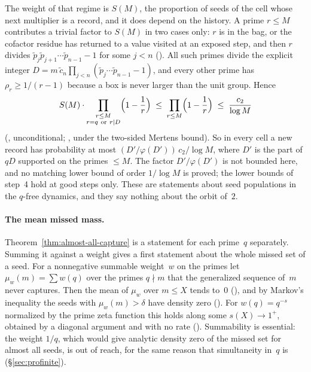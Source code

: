 The weight of that regime is $S(M)$, the proportion of seeds of the cell
whose next multiplier is a record, and it does depend on the history.  A
prime $r\le M$ contributes a trivial factor to $S(M)$ in two cases only:
$r$ is in the bag, or the cofactor residue has returned to a value visited
at an exposed step, and then $r$ divides
$\tilde p_j\tilde p_{j+1}\cdots\tilde p_{n-1}-1$ for some $j<n$
().
All such primes divide the explicit integer
$D=m\,\tilde c_n\prod_{j<n}(\tilde p_j\cdots\tilde p_{n-1}-1)$, and every
other prime has $\rho_r\ge 1/(r-1)$ because a box is never larger than the
unit group.  Hence
\[
  S(M)\cdot\prod_{\substack{r\le M\\ r=q\ \text{or}\ r\mid D}}
     \Bigl(1-\frac1r\Bigr)
  \;\le\; \prod_{r\le M}\Bigl(1-\frac1r\Bigr)
  \;\le\; \frac{c_2}{\log M}
\]
(,
unconditional; ,
under the two-sided Mertens bound).  So in every cell a new record has
probability at most $(D'/\varphi(D'))\,c_2/\log M$, where $D'$ is the part
of $qD$ supported on the primes $\le M$.  The factor $D'/\varphi(D')$ is
not bounded here, and no matching lower bound of order $1/\log M$ is
proved; the lower bounds of step~4 hold at good steps only.  These are
statements about seed populations in the $q$-free dynamics, and they say
nothing about the orbit of~$2$.

\paragraph{The mean missed mass.}
Theorem~\ref{thm:almost-all-capture} is a statement for each prime~$q$
separately.  Summing it against a weight gives a first statement about the
whole missed set of a seed.  For a nonnegative summable weight~$w$ on the
primes let $\mu_w(m)=\sum w(q)$ over the primes $q\nmid m$ that the
generalized sequence of~$m$ never captures.  Then the mean of $\mu_w$ over
$m\le X$ tends to~$0$
(), and by
Markov's inequality the seeds with $\mu_w(m)>\delta$ have density zero
().  For
$w(q)=q^{-s}$ normalized by the prime zeta function this holds along some
$s(X)\to1^+$, obtained by a diagonal argument and with no rate
().
Summability is essential: the weight $1/q$, which would give analytic
density zero of the missed set for almost all seeds, is out of reach, for
the same reason that simultaneity in~$q$ is
(\S\ref{sec:profinite}).

